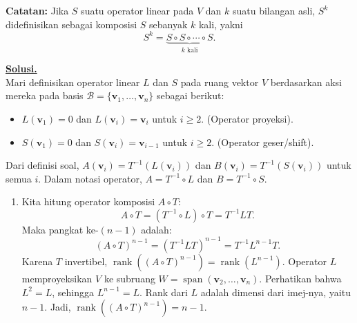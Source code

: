 \documentclass[12pt,twoside]{article}
\newenvironment{solution}
{
	\par\noindent\textbf{\underline{Solusi.}}\\
}
{
	\par
}
\begin{document}
\begin{enumerate}
        \textbf{Catatan:} Jika $S$ suatu operator linear pada $V$ dan $k$ suatu bilangan asli, $S^k$ didefinisikan sebagai komposisi $S$ sebanyak $k$ kali, yakni
        \[
          S^k = \underbrace{S \circ S \circ \cdots \circ S}_{k \text{ kali}}.
        \]

        \begin{solution}
          Mari definisikan operator linear $L$ dan $S$ pada ruang vektor $V$ berdasarkan aksi mereka pada basis $\mathcal{B} = \{\mathbf{v}_1, \dots, \mathbf{v}_n\}$ sebagai berikut:
          \begin{itemize}
            \item $L(\mathbf{v}_1) = 0$ dan $L(\mathbf{v}_i) = \mathbf{v}_i$ untuk $i \ge 2$. (Operator proyeksi).
            \item $S(\mathbf{v}_1) = 0$ dan $S(\mathbf{v}_i) = \mathbf{v}_{i-1}$ untuk $i \ge 2$. (Operator geser/shift).
          \end{itemize}
          Dari definisi soal, $A(\mathbf{v}_i) = T^{-1}(L(\mathbf{v}_i))$ dan $B(\mathbf{v}_i) = T^{-1}(S(\mathbf{v}_i))$ untuk semua $i$.
          Dalam notasi operator, $A = T^{-1} \circ L$ dan $B = T^{-1} \circ S$.

          \begin{enumerate}
            \item Kita hitung operator komposisi $A \circ T$:
                  \[ A \circ T = (T^{-1} \circ L) \circ T = T^{-1} L T. \]
                  Maka pangkat ke-$(n-1)$ adalah:
                  \[ (A \circ T)^{n-1} = (T^{-1} L T)^{n-1} = T^{-1} L^{n-1} T. \]
                  Karena $T$ invertibel, $\operatorname{rank}((A \circ T)^{n-1}) = \operatorname{rank}(L^{n-1})$.
                  Operator $L$ memproyeksikan $V$ ke subruang $W = \operatorname{span}(\mathbf{v}_2, \dots, \mathbf{v}_n)$. Perhatikan bahwa $L^2 = L$, sehingga $L^{n-1} = L$.
                  Rank dari $L$ adalah dimensi dari imej-nya, yaitu $n-1$.
                  Jadi, $\operatorname{rank}((A \circ T)^{n-1}) = n-1$.


\end{enumerate}
\end{solution}
\end{enumerate}
\end{document}

